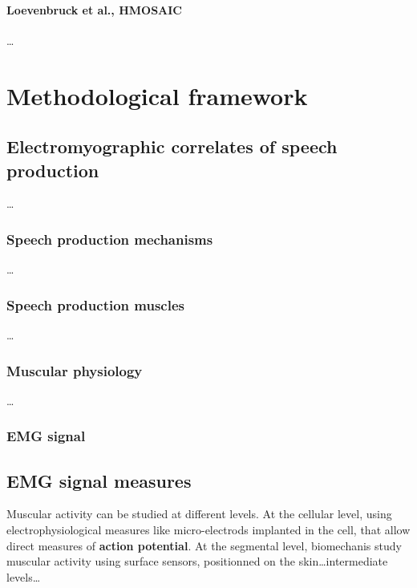 \documentclass[a4paper,12pt,twoside,openright,oldfontcommands]{memoir}
\begin{document}
\subsubsection{Loevenbruck et al.,
HMOSAIC}\label{loevenbruck-et-al.-hmosaic}

\ldots{}

\chapter{Methodological framework}\label{methodological-framework}

\section{Electromyographic correlates of speech
production}\label{electromyographic-correlates-of-speech-production}

\ldots{}

\subsection{Speech production
mechanisms}\label{speech-production-mechanisms}

\ldots{}

\subsection{Speech production muscles}\label{speech-production-muscles}

\ldots{}

\subsection{Muscular physiology}\label{muscular-physiology}

\ldots{}

\subsection{EMG signal}\label{emg-signal}

\section{EMG signal measures}\label{emg-signal-measures}

Muscular activity can be studied at different levels. At the cellular
level, using electrophysiological measures like micro-electrods
implanted in the cell, that allow direct measures of \textbf{action
potential}. At the segmental level, biomechanis study muscular activity
using surface sensors, positionned on the skin\ldots{}intermediate
levels\ldots{}
\end{document}
